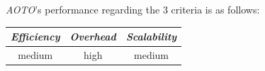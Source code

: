 %
\emph{AOTO}'s performance regarding the $3$ criteria is as follows:
\begin{center}
{\footnotesize
\begin{tabular}{ccc}
\emph{Efficiency} & \emph{Overhead} & \emph{Scalability} \\
\hline
%
medium &
high &
medium
\end{tabular}
}
\end{center}

